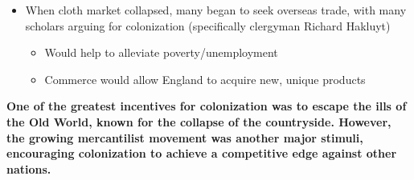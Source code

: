 \documentclass[a4paper]{article}
\begin{document}
{\begin{itemize}
\begin{itemize}
\begin{itemize}
                        \item Boosted position of merchant capitalists (believed to have been helping the nation, requiriing government assistance)
                        \item Led to greater competition between nations 
                    \end{itemize}
                    \item When cloth market collapsed, many began to seek overseas trade, with many scholars arguing for colonization (specifically clergyman Richard Hakluyt)
                    \begin{itemize}
                        \item Would help to alleviate poverty/unemployment
                        \item Commerce would allow England to acquire new, unique products
                    \end{itemize}
                \end{itemize} 
            \end{itemize}
            \textbf{One of the greatest incentives for colonization was to escape the ills of the Old World, known for the collapse of the countryside. However, the growing mercantilist movement was another major stimuli, encouraging colonization to achieve a competitive edge against other nations.}
        }
\end{document}
